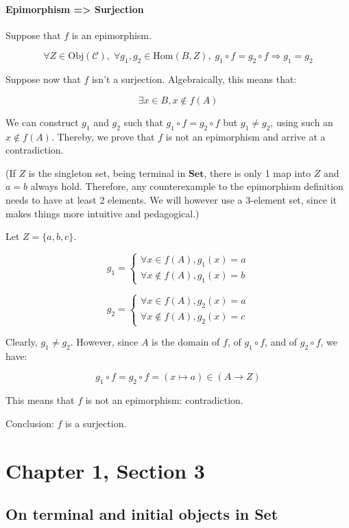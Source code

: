 \documentclass[12pt, letterpaper, twoside]{report}
\begin{document}
\subsubsection*{Epimorphism => Surjection}

Suppose that $f$ is an epimorphism.

$$
\forall Z \in \text{Obj}(\mathcal{C}), \;
\forall g_1, g_2 \in \text{Hom}(B, Z), \;
g_1 \circ f = g_2 \circ f \Rightarrow g_1 = g_2
$$

Suppose now that $f$ isn't a surjection. Algebraically, this means that:

$$\exists x \in B, x \notin f(A)$$

We can construct $g_1$ and $g_2$ such that $g_1 \circ f = g_2 \circ f$ but $g_1 \neq g_2$, using such an $x \notin f(A)$. Thereby, we prove that $f$ is not an epimorphism and arrive at a contradiction.

(If $Z$ is the singleton set, being terminal in $\mathbf{Set}$, there is only 1 map into $Z$ and $a = b$ always hold. Therefore, any counterexample to the epimorphism definition needs to have at least 2 elements. We will however use a 3-element set, since it makes things more intuitive and pedagogical.)

Let $Z = \{a, b, c\}$.

$$
g_1 =
\begin{cases}
	\forall x    \in f(A), g_1(x) = a \\
	\forall x \notin f(A), g_1(x) = b
\end{cases}
$$

$$
g_2 =
\begin{cases}
	\forall x    \in f(A), g_2(x) = a \\
	\forall x \notin f(A), g_2(x) = c
\end{cases}
$$

Clearly, $g_1 \neq g_2$. However, since $A$ is the domain of $f$, of $g_1 \circ f$, and of $g_2 \circ f$, we have:

$$
g_1 \circ f = g_2 \circ f = (x \mapsto a) \in (A \to Z)
$$

This means that $f$ is not an epimorphism: contradiction.

Conclusion: $f$ is a surjection.
\chapter*{Chapter 1, Section 3}

\section*{On terminal and initial objects in \textbf{Set}}
\end{document}

